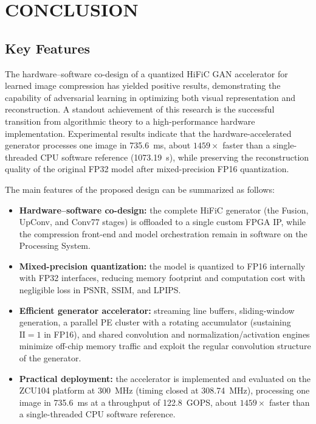 \newpage
\section*{CONCLUSION}
\setcounter{section}{5}
\setcounter{subsection}{0}
\setcounter{subsubsection}{0}
\setcounter{paragraph}{0}
\setcounter{figure}{0}
\setcounter{table}{0}

\subsection*{Key Features}

The hardware--software co-design of a quantized HiFiC GAN accelerator for learned image compression has yielded positive results, demonstrating the capability of adversarial learning in optimizing both visual representation and reconstruction. A standout achievement of this research is the successful transition from algorithmic theory to a high-performance hardware implementation. Experimental results indicate that the hardware-accelerated generator processes one image in 735.6~ms, about $1459\times$ faster than a single-threaded CPU software reference (1073.19~s), while preserving the reconstruction quality of the original FP32 model after mixed-precision FP16 quantization.

The main features of the proposed design can be summarized as follows:
\begin{itemize}
    \item \textbf{Hardware--software co-design:} the complete HiFiC generator (the Fusion, UpConv, and Conv77 stages) is offloaded to a single custom FPGA IP, while the compression front-end and model orchestration remain in software on the Processing System.
    \item \textbf{Mixed-precision quantization:} the model is quantized to FP16 internally with FP32 interfaces, reducing memory footprint and computation cost with negligible loss in PSNR, SSIM, and LPIPS.
    \item \textbf{Efficient generator accelerator:} streaming line buffers, sliding-window generation, a parallel PE cluster with a rotating accumulator (sustaining $\text{II}=1$ in FP16), and shared convolution and normalization/activation engines minimize off-chip memory traffic and exploit the regular convolution structure of the generator.
    \item \textbf{Practical deployment:} the accelerator is implemented and evaluated on the ZCU104 platform at 300~MHz (timing closed at 308.74~MHz), processing one image in 735.6~ms at a throughput of 122.8~GOPS, about $1459\times$ faster than a single-threaded CPU software reference.
\end{itemize}

